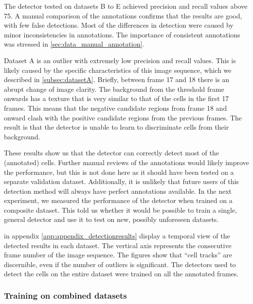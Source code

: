 		The detector tested on datasets B to E achieved precision and recall values above 75. A manual comparison of the annotations confirms that the results are good, with few false detections. Most of the differences in detection were caused by minor inconsistencies in annotations. The importance of consistent annotations was stressed in \cref{sec:data_manual_annotation}.
		
		Dataset A is an outlier with extremely low precision and recall values. This is likely caused by the specific characteristics of this image sequence, which we described in \cref{subsec:datasetA}. Briefly, between frame 17 and 18 there is an abrupt change of image clarity. The background from the threshold frame onwards has a texture that is very similar to that of the cells in the first 17 frames. This means that the negative candidate regions from frame 18 and onward clash with the positive candidate regions from the previous frames. The result is that the detector is unable to learn to discriminate cells from their background.
		
		These results show us that the detector can correctly detect most of the (annotated) cells. Further manual reviews of the annotations would likely improve the performance, but this is not done here as it should have been tested on a separate validation dataset. Additionally, it is unlikely that future users of this detection method will always have perfect annotations available. In the next experiment, we measured the performance of the detector when trained on a composite dataset. This told us whether it would be possible to train a single, general detector and use it to test on new, possibly unforeseen datasets.

		 in appendix \ref{app:appendix_detectionresults} display a temporal view of the detected results in each dataset. The vertical axis represents the consecutive frame number of the image sequence. The figures show that ``cell tracks'' are discernible, even if the number of outliers is significant. The detectors used to detect the cells on the entire dataset were trained on all the annotated frames.

		\subsubsection{Training on combined datasets}
		
